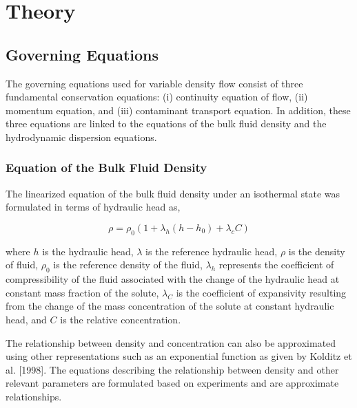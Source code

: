 
\section{Theory}
\subsection{Governing Equations}\label{SS:GoverningEquation}

The governing equations used for variable density flow consist of
three fundamental conservation equations: (i) continuity equation of
flow, (ii) momentum equation, and (iii) contaminant transport
equation. In addition, these three equations are linked to the
equations of the bulk fluid density and the hydrodynamic dispersion
equations.

\subsubsection{Equation of the Bulk Fluid Density}\label{SS:BulkFluidDensity}
The linearized equation of the bulk fluid density under an
isothermal state was formulated in terms of hydraulic head as,

\begin{equation}\label{bulkfluiddensity}
\rho  = \rho _0 \left( {1 + \lambda _h \left( {h - h_0 } \right) +
\lambda _c C} \right)
\end{equation}

where $h$ is the hydraulic head, $\lambda$ is the reference
hydraulic head, $\rho$ is the density of fluid, $\rho _0$ is the
reference density of the fluid, $\lambda _h$ represents the
coefficient of compressibility of the fluid associated with the
change of the hydraulic head at constant mass fraction of the
solute, $\lambda _C$ is the coefficient of expansivity resulting
from the change of the mass concentration of the solute at constant
hydraulic head, and $C$ is the relative concentration.

The relationship between density and concentration can also be
approximated using other representations such as an exponential
function as given by Kolditz et al. [1998]. The equations describing
the relationship between density and other relevant parameters are
formulated based on experiments and are approximate relationships.

